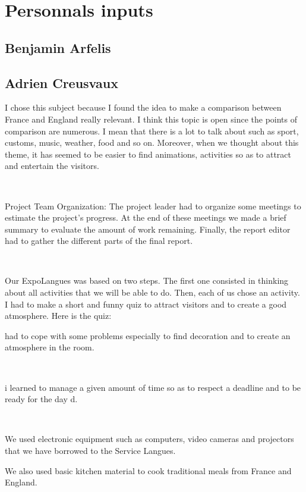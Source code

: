 \documentclass[11pt;a4paper]{report}
\begin{document}
 \chapter{Personnals inputs}


  \section{Benjamin Arfelis}
\newpage
  \section{Adrien Creusvaux}

I chose this subject because I found the idea to make a comparison between France and England really relevant. I think this topic is open since the points of comparison are numerous. I mean that there is a lot to talk about such as sport, customs, music, weather, food and so on.
Moreover, when we thought about this theme, it has seemed to be easier to find animations, activities so as to attract and entertain the visitors.

~

Project Team Organization:
The project leader had to organize some meetings to estimate the project’s progress. At the end of these meetings we made a brief summary to evaluate the amount of work remaining.
Finally, the report editor had to gather the different parts of the final report.

~

Our ExpoLangues was based on two steps.
The first one consisted in thinking about all activities that we will be able to do.
Then, each of us chose an activity.
I had to make a short and funny quiz to attract visitors and to create a good atmosphere. Here is the quiz:


 had to cope with some problems especially to find decoration and to create an atmosphere in the room.

~

i learned to manage a given amount of time so as to respect a deadline and to be ready for the day d.

~

We used electronic equipment such as computers, video cameras and projectors that we have borrowed to the Service Langues.

We also used basic kitchen material to cook traditional meals from France and England.

~
\end{document}
